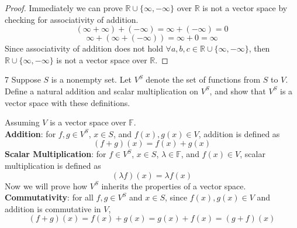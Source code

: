 \documentclass[12pt]{article}
\newenvironment{problem}[1]{\begin{prob*}{#1}{}}{\end{prob*}}
\newcommand{\F}{\mathbb{F}}
\newcommand{\R}{\mathbb{R}}
\begin{document}
    \begin{proof}
    Immediately we can prove $\R \cup \{\infty,-\infty\}$ over $\R$ is not a vector space by checking for associativity of addition. 
    \[(\infty + \infty )+(-\infty)=\infty +(-\infty)=0\]
    \[\infty +(\infty +(-\infty))=\infty + 0=\infty\]
    Since associativity of addition does not hold $\forall a,b,c\in \R\cup\{\infty, -\infty\}$, then $\R \cup \{\infty, -\infty\}$ is not a vector space over $\R$.
    \end{proof}

    \begin{problem}{7}
        Suppose $S$ is a nonempty set. Let $V^S$ denote the set of functions from $S$ to $V$. Define a natural addition and scalar multiplication on $V^S$, and show that $V^S$ is a vector space with these definitions.
    \end{problem}
    Assuming $V$ is a vector space over $\F$.\\
    \noindent \textbf{Addition}: for $f,g\in V^S$, $x\in S$, and $f(x),g(x)\in V$, addition is defined as 
    \[(f+g)(x)=f(x)+g(x)\]
    \noindent \textbf{Scalar Multiplication}: for $f\in V^S$, $x\in S$, $\lambda \in \F$, and $f(x)\in V$, scalar multiplication is defined as
    \[(\lambda f)(x)=\lambda f(x)\]
    Now we will prove how $V^S$ inherits the properties of a vector space.\\
    \noindent \textbf{Commutativity}: for all $f,g\in V^S$ and $x\in S$, since $f(x),g(x)\in V$ and addition is commutative in $V$,
    \[(f+g)(x)=f(x)+g(x)=g(x)+f(x)=(g+f)(x)\]
\end{document}

